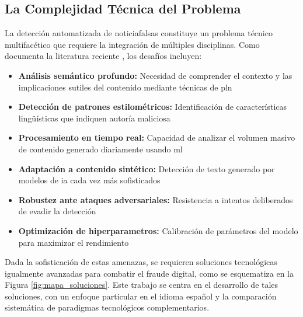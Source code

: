 \subsection{La Complejidad Técnica del Problema}

La detección automatizada de \glspl{noticiafalsa} constituye un problema técnico multifacético que requiere la integración de múltiples disciplinas. Como documenta la literatura reciente \cite{singh2023comprehensive}, los desafíos incluyen:

\begin{itemize}
    \item \textbf{Análisis semántico profundo:} Necesidad de comprender el contexto y las implicaciones sutiles del contenido mediante técnicas de \gls{pln}
    \item \textbf{Detección de patrones estilométricos:} Identificación de características lingüísticas que indiquen autoría maliciosa \cite{tsai2023stylometric}
    \item \textbf{Procesamiento en tiempo real:} Capacidad de analizar el volumen masivo de contenido generado diariamente usando \gls{ml}
    \item \textbf{Adaptación a contenido sintético:} Detección de texto generado por modelos de \gls{ia} cada vez más sofisticados \cite{su2023adapting}
    \item \textbf{Robustez ante ataques adversariales:} Resistencia a intentos deliberados de evadir la detección
    \item \textbf{Optimización de \glspl{hiperparametro}:} Calibración de parámetros del modelo para maximizar el rendimiento
\end{itemize}

Dada la sofisticación de estas amenazas, se requieren soluciones tecnológicas igualmente avanzadas para combatir el fraude digital, como se esquematiza en la Figura \ref{fig:mapa_soluciones}. Este trabajo se centra en el desarrollo de tales soluciones, con un enfoque particular en el idioma español y la comparación sistemática de paradigmas tecnológicos complementarios.

